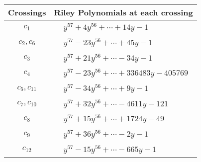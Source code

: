\documentclass[1p]{elsarticle_modified}
\theoremstyle{definition}
\begin{document}
\begin{tabular}{m{50pt}|m{274pt}}
Crossings & \hspace{64pt}Riley Polynomials at each crossing \\
\hline $$\begin{aligned}c_{1}\end{aligned}$$&$\begin{aligned}
&y^{57}+4 y^{56}+\cdots+14 y-1
\end{aligned}$\\
\hline $$\begin{aligned}c_{2},c_{6}\end{aligned}$$&$\begin{aligned}
&y^{57}-23 y^{56}+\cdots+45 y-1
\end{aligned}$\\
\hline $$\begin{aligned}c_{3}\end{aligned}$$&$\begin{aligned}
&y^{57}+21 y^{56}+\cdots-34 y-1
\end{aligned}$\\
\hline $$\begin{aligned}c_{4}\end{aligned}$$&$\begin{aligned}
&y^{57}-23 y^{56}+\cdots+336483 y-405769
\end{aligned}$\\
\hline $$\begin{aligned}c_{5},c_{11}\end{aligned}$$&$\begin{aligned}
&y^{57}-34 y^{56}+\cdots+9 y-1
\end{aligned}$\\
\hline $$\begin{aligned}c_{7},c_{10}\end{aligned}$$&$\begin{aligned}
&y^{57}+32 y^{56}+\cdots-4611 y-121
\end{aligned}$\\
\hline $$\begin{aligned}c_{8}\end{aligned}$$&$\begin{aligned}
&y^{57}+15 y^{56}+\cdots+1724 y-49
\end{aligned}$\\
\hline $$\begin{aligned}c_{9}\end{aligned}$$&$\begin{aligned}
&y^{57}+36 y^{56}+\cdots-2 y-1
\end{aligned}$\\
\hline $$\begin{aligned}c_{12}\end{aligned}$$&$\begin{aligned}
&y^{57}-15 y^{56}+\cdots-665 y-1
\end{aligned}$\\
\hline
\end{tabular}\\~\\
\end{document}
